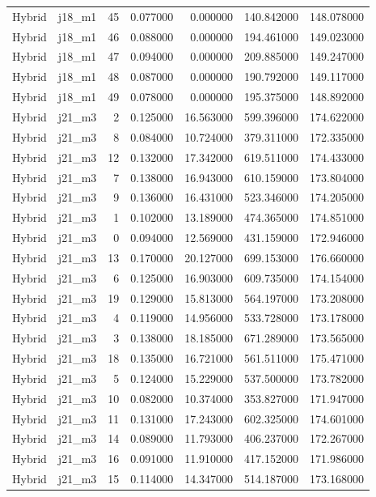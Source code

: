\begin{tabular}{llrrrrr}
Hybrid & j18_m1 & 45 & 0.077000 & 0.000000 & 140.842000 & 148.078000 \\
Hybrid & j18_m1 & 46 & 0.088000 & 0.000000 & 194.461000 & 149.023000 \\
Hybrid & j18_m1 & 47 & 0.094000 & 0.000000 & 209.885000 & 149.247000 \\
Hybrid & j18_m1 & 48 & 0.087000 & 0.000000 & 190.792000 & 149.117000 \\
Hybrid & j18_m1 & 49 & 0.078000 & 0.000000 & 195.375000 & 148.892000 \\
Hybrid & j21_m3 & 2 & 0.125000 & 16.563000 & 599.396000 & 174.622000 \\
Hybrid & j21_m3 & 8 & 0.084000 & 10.724000 & 379.311000 & 172.335000 \\
Hybrid & j21_m3 & 12 & 0.132000 & 17.342000 & 619.511000 & 174.433000 \\
Hybrid & j21_m3 & 7 & 0.138000 & 16.943000 & 610.159000 & 173.804000 \\
Hybrid & j21_m3 & 9 & 0.136000 & 16.431000 & 523.346000 & 174.205000 \\
Hybrid & j21_m3 & 1 & 0.102000 & 13.189000 & 474.365000 & 174.851000 \\
Hybrid & j21_m3 & 0 & 0.094000 & 12.569000 & 431.159000 & 172.946000 \\
Hybrid & j21_m3 & 13 & 0.170000 & 20.127000 & 699.153000 & 176.660000 \\
Hybrid & j21_m3 & 6 & 0.125000 & 16.903000 & 609.735000 & 174.154000 \\
Hybrid & j21_m3 & 19 & 0.129000 & 15.813000 & 564.197000 & 173.208000 \\
Hybrid & j21_m3 & 4 & 0.119000 & 14.956000 & 533.728000 & 173.178000 \\
Hybrid & j21_m3 & 3 & 0.138000 & 18.185000 & 671.289000 & 173.565000 \\
Hybrid & j21_m3 & 18 & 0.135000 & 16.721000 & 561.511000 & 175.471000 \\
Hybrid & j21_m3 & 5 & 0.124000 & 15.229000 & 537.500000 & 173.782000 \\
Hybrid & j21_m3 & 10 & 0.082000 & 10.374000 & 353.827000 & 171.947000 \\
Hybrid & j21_m3 & 11 & 0.131000 & 17.243000 & 602.325000 & 174.601000 \\
Hybrid & j21_m3 & 14 & 0.089000 & 11.793000 & 406.237000 & 172.267000 \\
Hybrid & j21_m3 & 16 & 0.091000 & 11.910000 & 417.152000 & 171.986000 \\
Hybrid & j21_m3 & 15 & 0.114000 & 14.347000 & 514.187000 & 173.168000 \\

\end{tabular}

